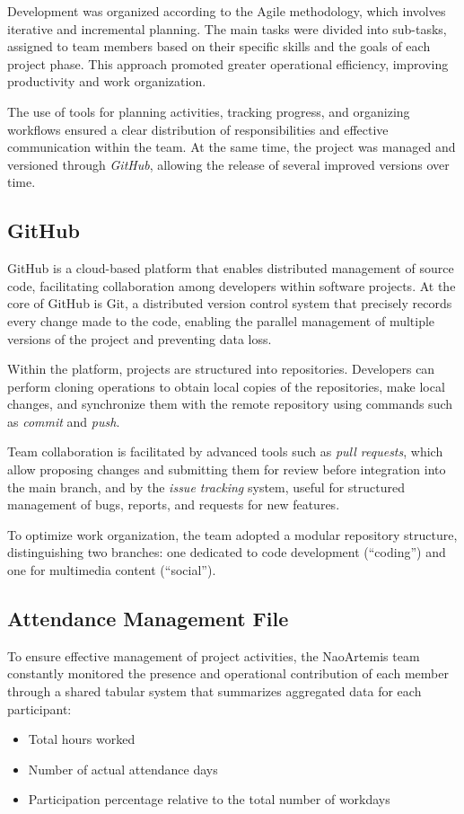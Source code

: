 \documentclass{optica-article}
\begin{document}
\begin{abstract*}
Development was organized according to the Agile methodology, which involves iterative and incremental planning. The main tasks were divided into sub-tasks, assigned to team members based on their specific skills and the goals of each project phase. This approach promoted greater operational efficiency, improving productivity and work organization.

The use of tools for planning activities, tracking progress, and organizing workflows ensured a clear distribution of responsibilities and effective communication within the team.  
At the same time, the project was managed and versioned through \textit{GitHub}, allowing the release of several improved versions over time.

\subsection{GitHub}
GitHub is a cloud-based platform that enables distributed management of source code, facilitating collaboration among developers within software projects. At the core of GitHub is Git, a distributed version control system that precisely records every change made to the code, enabling the parallel management of multiple versions of the project and preventing data loss.

Within the platform, projects are structured into repositories. Developers can perform cloning operations to obtain local copies of the repositories, make local changes, and synchronize them with the remote repository using commands such as \emph{commit} and \emph{push}.

Team collaboration is facilitated by advanced tools such as \emph{pull requests}, which allow proposing changes and submitting them for review before integration into the main branch, and by the \emph{issue tracking} system, useful for structured management of bugs, reports, and requests for new features.

To optimize work organization, the team adopted a modular repository structure, distinguishing two branches: one dedicated to code development (“coding”) and one for multimedia content (“social”).

\subsection{Attendance Management File}
To ensure effective management of project activities, the NaoArtemis team constantly monitored the presence and operational contribution of each member through a shared tabular system that summarizes aggregated data for each participant:
\begin{itemize}
  \item Total hours worked
  \item Number of actual attendance days
  \item Participation percentage relative to the total number of workdays 
\end{itemize}


\end{abstract*}
\end{document}
